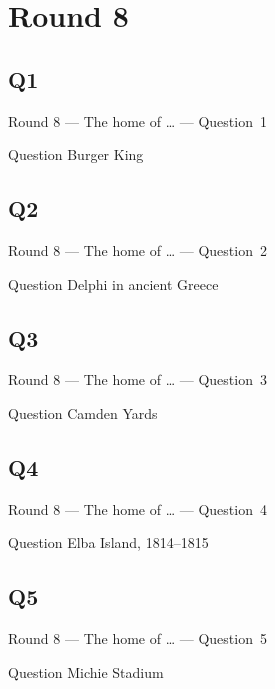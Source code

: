 \documentclass[11pt]{beamer}
\begin{document}
\section{Round 8}
\subsection*{Q1}
\begin{frame}[t]{Round 8 --- The home of \ldots{} --- \mbox{Question 1}}
    \vspace{-0.5em}
    \begin{block}{Question}
        Burger King
    \end{block}
\end{frame}
\subsection*{Q2}
\begin{frame}[t]{Round 8 --- The home of \ldots{} --- \mbox{Question 2}}
    \vspace{-0.5em}
    \begin{block}{Question}
        Delphi in ancient Greece
    \end{block}
\end{frame}
\subsection*{Q3}
\begin{frame}[t]{Round 8 --- The home of \ldots{} --- \mbox{Question 3}}
    \vspace{-0.5em}
    \begin{block}{Question}
        Camden Yards
    \end{block}
\end{frame}
\subsection*{Q4}
\begin{frame}[t]{Round 8 --- The home of \ldots{} --- \mbox{Question 4}}
    \vspace{-0.5em}
    \begin{block}{Question}
        Elba Island, 1814--1815
    \end{block}
\end{frame}
\subsection*{Q5}
\begin{frame}[t]{Round 8 --- The home of \ldots{} --- \mbox{Question 5}}
    \vspace{-0.5em}
    \begin{block}{Question}
        Michie Stadium
    \end{block}
\end{frame}
\end{document}
